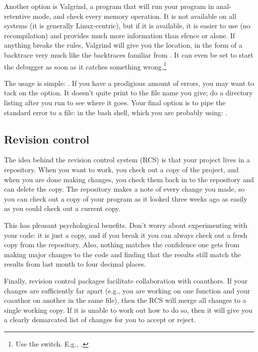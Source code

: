 \documentclass[12pt]{article}
\def\ind#1{\index{#1}#1}
\begin{document}
Another option is \ind{Valgrind}, a program that will
run your program in anal-retentive mode, and check every memory operation. 
It is not available on all systems (it is generally Linux-centric), but
if it is available, it is easier to use (no recompilation) and provides much more information than efence or
 alone. If anything breaks the rules, Valgrind will give you
the location, in the form of a backtrace very much like the backtraces
familiar from . It can even be set to start the debugger as soon
as it catches something wrong.\footnote{Use the  switch.
E.g., .}

The usage is simple: . If you have a prodigious amount
of errors, you may want to tack on the  option. It doesn't
quite print to the file name you give; do a directory listing after you run  to see where it goes.  Your final option is to pipe the standard
error to a file: in the bash shell, which you are probably using: .

\subsection{Revision control}  \label{valgrind}
The idea behind the revision control system (RCS) is that your project
lives in a repository. When you want to work, you check out
a copy of the project, and when you are done making changes, you check
them back in to the repository and can delete the copy.  The repository
makes a note of every change you made, so you can check out a copy of
your program as it looked three weeks ago as easily as you could check
out a current copy.

This has pleasant psychological benefits. Don't worry about experimenting
with your code: it is just a copy, and if you break it you can always check
out a fresh copy from the repository. Also, nothing matches the confidence
one gets from making major changes to the code and finding that the
results still match the results from last month to four decimal places.

Finally, revision control packages facilitate collaboration with
coauthors. If your changes are sufficiently far apart (e.g., you are
working on one function and your coauthor on another in the same file),
then the RCS will merge all changes to a single working copy. If
it is unable to work out how to do so, then it will give you a
clearly demarcated list of changes for you to accept or reject.
\end{document}
